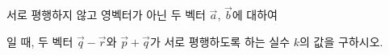 서로 평행하지 않고 영벡터가 아닌 두 벡터 $\vec{a}$, $\vec{b}$에 대하여 \par\smallskip{}\par\smallskip\noindent 일 때, 두 벡터 $\vec{q}-\vec{r}$와 $\vec{p}+\vec{q}$가 서로 평행하도록 하는 실수 $k$의 값을 구하시오.
